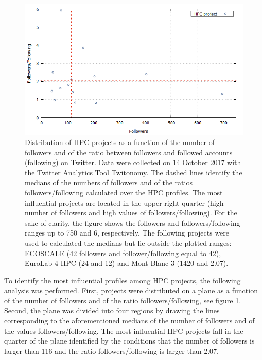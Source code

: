\begin{figure}[!t] 
 \begin{center}
 \includegraphics[scale=0.45]{Images/HPC_influence.png}
 \caption{Distribution of HPC projects as a function of the number of followers and of the ratio between followers and followed accounts (following) on Twitter. Data were collected on 14 October 2017 with the Twitter Analytics Tool Twitonomy. The dashed lines identify the medians of the numbers of followers and of the ratios followers/following calculated over the HPC profiles. The most influential projects are located in the upper right quarter (high number of followers and high values of followers/following). For the sake of clarity, the figure shows the followers and followers/following ranges up to 750 and 6, respectively. The following projects were used to calculated the medians but lie outside the plotted ranges: ECOSCALE (42 followers and follower/following equal to 42), EuroLab-4-HPC (24 and 12) and Mont-Blanc 3 (1420 and 2.07).}
 \label{HPC_influence_plot}
 \end{center}
\end{figure}

To identify the most influential profiles among HPC projects, the following analysis was performed. First, projects were distributed on a plane as a function of the number of followers and of the ratio followers/following, see figure \ref{HPC_influence_plot}. Second, the plane was divided into four regions by drawing the lines corresponding to the aforementioned medians of the number of followers and of the values followers/following. The most influential HPC projects fall in the quarter of the plane identified by the conditions that the number of followers is larger than 116 and the ratio followers/following is larger than 2.07.

